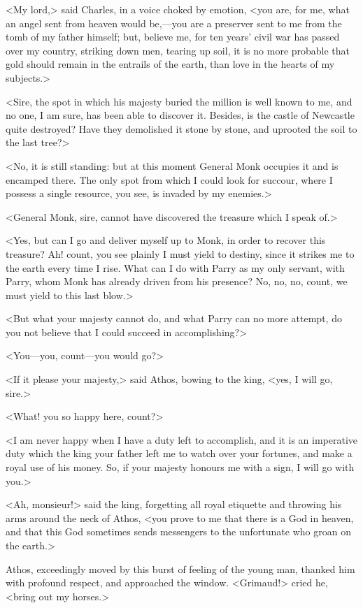 <My lord,> said Charles, in a voice choked by emotion, <you are, for me, what an angel sent from heaven would be,—you are a preserver sent to me from the tomb of my father himself; but, believe me, for ten years' civil war has passed over my country, striking down men, tearing up soil, it is no more probable that gold should remain in the entrails of the earth, than love in the hearts of my subjects.>

<Sire, the spot in which his majesty buried the million is well known to me, and no one, I am sure, has been able to discover it. Besides, is the castle of Newcastle quite destroyed? Have they demolished it stone by stone, and uprooted the soil to the last tree?>

<No, it is still standing: but at this moment General Monk occupies it and is encamped there. The only spot from which I could look for succour, where I possess a single resource, you see, is invaded by my enemies.>

<General Monk, sire, cannot have discovered the treasure which I speak of.>

<Yes, but can I go and deliver myself up to Monk, in order to recover this treasure? Ah! count, you see plainly I must yield to destiny, since it strikes me to the earth every time I rise. What can I do with Parry as my only servant, with Parry, whom Monk has already driven from his presence? No, no, no, count, we must yield to this last blow.>

<But what your majesty cannot do, and what Parry can no more attempt, do you not believe that I could succeed in accomplishing?>

<You—you, count—you would go?>

<If it please your majesty,> said Athos, bowing to the king, <yes, I will go, sire.>

<What! you so happy here, count?>

<I am never happy when I have a duty left to accomplish, and it is an imperative duty which the king your father left me to watch over your fortunes, and make a royal use of his money. So, if your majesty honours me with a sign, I will go with you.>

<Ah, monsieur!> said the king, forgetting all royal etiquette and throwing his arms around the neck of Athos, <you prove to me that there is a God in heaven, and that this God sometimes sends messengers to the unfortunate who groan on the earth.>

Athos, exceedingly moved by this burst of feeling of the young man, thanked him with profound respect, and approached the window. <Grimaud!> cried he, <bring out my horses.>

